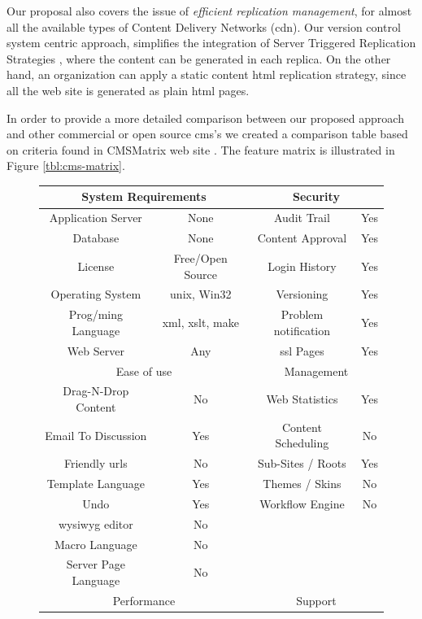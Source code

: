 \documentclass{elsart}
\begin{document}
Our proposal also covers the issue of \textit{efficient replication management}, for almost all the available types of Content Delivery Networks ({\sc cdn}). Our version control system centric approach, simplifies the integration of Server Triggered Replication Strategies \cite{SSPS04}, where the content can be generated in each replica. On the other hand, an organization can apply a static content {\sc html} replication strategy, since all the web site is generated as plain {\sc html} pages.

In order to provide a more detailed comparison between our proposed approach and other commercial or open source {\sc cms's} we 
created a comparison table based on criteria found in CMSMatrix web site \cite{PBC05}. The feature matrix is illustrated in Figure \ref{tbl:cms-matrix}.

\begin{figure}
\begin{center}
\begin{tabular}{c c | c c}
\hline
\multicolumn{2}{c|}{System Requirements} & \multicolumn{2}{c}{Security}\\
\hline
Application Server & None & Audit Trail & Yes\\
Database & None & Content Approval & Yes\\
License & Free/Open Source & Login History & Yes\\
Operating System & {\sc unix}, Win32 & Versioning & Yes\\
Prog/ming Language & {\sc xml, xslt}, make & Problem notification & Yes\\
Web Server & Any & {\sc ssl} Pages & Yes\\
\hline
\multicolumn{2}{c|}{Ease of use} & \multicolumn{2}{c}{Management}\\
\hline
Drag-N-Drop Content & No & Web Statistics & Yes\\
Email To Discussion & Yes & Content Scheduling & No\\
Friendly {\sc url}s & No & Sub-Sites / Roots & Yes\\
Template Language & Yes & Themes / Skins & No\\
Undo & Yes & Workflow Engine & No\\
{\sc wysiwyg} editor & No & &\\
Macro Language & No & &\\
Server Page Language & No & &\\
\hline
\multicolumn{2}{c|}{Performance} & \multicolumn{2}{c}{Support}\\

\end{tabular}
\end{center}
\end{figure}
\end{document}
